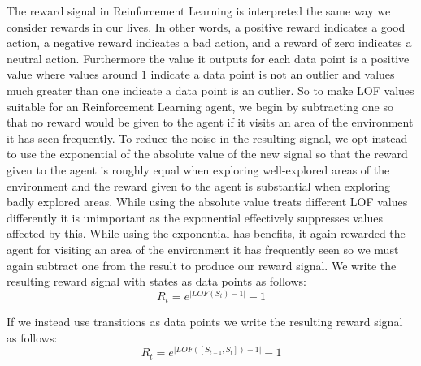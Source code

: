 \documentclass[../main.tex]{subfiles}
\begin{document}
The reward signal in Reinforcement Learning is interpreted the same way we consider rewards in our lives. In other words, a positive reward indicates a good action, a negative reward indicates a bad action, and a reward of zero indicates a neutral action.  Furthermore the value it outputs for each data point is a positive value where values around $1$ indicate a data point is not an outlier and values much greater than one indicate a data point is an outlier.  So to make LOF values suitable for an Reinforcement Learning agent, we begin by subtracting one so that no reward would be given to the agent if it visits an area of the environment it has seen frequently. To reduce the noise in the resulting signal, we opt instead to use the exponential of the absolute value of the new signal so that the reward given to the agent is roughly equal when exploring well-explored areas of the environment and the reward given to the agent is substantial when exploring badly explored areas. While using the absolute value treats different LOF values differently it is unimportant as the exponential effectively suppresses values affected by this. While using the exponential has benefits, it again rewarded the agent for visiting an area of the environment it has frequently seen so we must again subtract one from the result to produce our reward signal. We write the resulting reward signal with states as data points as follows:
\begin{equation}
    \label{eqn:state_reward}
    R_t = e^{|LOF(S_t) - 1|} - 1
\end{equation}

If we instead use transitions as data points we write the resulting reward signal as follows:
\begin{equation}
    \label{eqn:transition_reward}
    R_t = e^{|LOF([S_{t - 1}, S_t]) - 1|} - 1
\end{equation}
\end{document}
